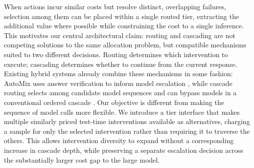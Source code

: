 \documentclass[sigconf]{acmart}
\begin{document}
 When actions incur similar costs but resolve distinct, overlapping failures, selection among them can be placed within a single routed tier, extracting the additional value where possible while constraining the cost to a single inference. This motivates our central architectural claim: routing and cascading are not competing solutions to the same allocation problem, but compatible mechanisms suited to two different decisions. Routing determines which intervention to execute; cascading determines whether to continue from the current response. Existing hybrid systems already combine these mechanisms in some fashion: AutoMix uses answer verification to inform model escalation \cite{automix}, while cascade routing selects among candidate model sequences and can bypass models in a conventional ordered cascade \cite{dekoninck2025unified}. Our objective is different from making the sequence of model calls more flexible. We introduce a tier interface that makes multiple similarly priced test-time interventions available as alternatives, charging a sample for only the selected intervention rather than requiring it to traverse the others. This allows intervention diversity to expand without a corresponding increase in cascade depth, while preserving a separate escalation decision across the substantially larger cost gap to the large model.
 
\end{document}
